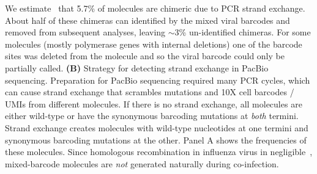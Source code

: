 \documentclass[10pt,letterpaper]{article}
\begin{document}
\begin{suppfig}
{We estimate~\citep{bloom2018estimating} that 5.7\% of molecules are chimeric due to PCR strand exchange.
About half of these chimeras can identified by the mixed viral barcodes and removed from subsequent analyses, leaving $\sim$3\% un-identified chimeras.
For some molecules (mostly polymerase genes with internal deletions) one of the barcode sites was deleted from the molecule and so the viral barcode could only be partially called.
{\bf (B)}
Strategy for detecting strand exchange in PacBio sequencing.
Preparation for PacBio sequencing required many PCR cycles, which can cause strand exchange that scrambles mutations and 10X cell barcodes / UMIs from different molecules.
If there is no strand exchange, all molecules are either wild-type or have the synonymous barcoding mutations at \emph{both} termini.
Strand exchange creates molecules with wild-type nucleotides at one termini and synonymous barcoding mutations at the other.
Panel A shows the frequencies of these molecules.
Since homologous recombination in influenza virus in negligible~\citep{boni2008homologous}, mixed-barcode molecules are \emph{not} generated naturally during co-infection.
}
\label{suppfig:PacBio_supp}
\end{suppfig}
\end{document}
